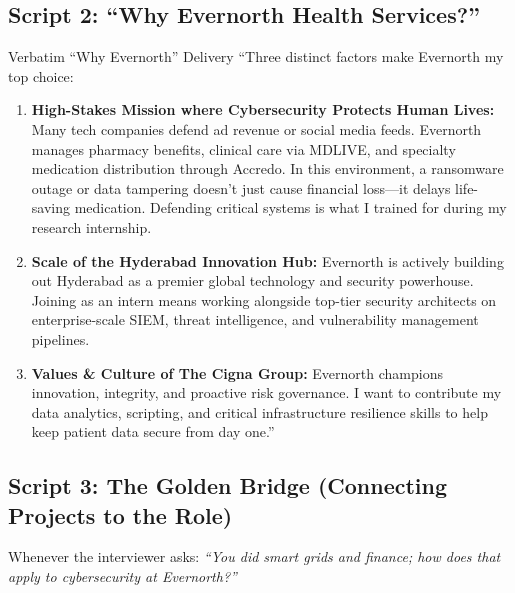 \documentclass[10pt,a4paper]{article}
\begin{document}
\subsection{Script 2: ``Why Evernorth Health Services?''}
\begin{scriptbox}{Verbatim ``Why Evernorth'' Delivery}
``Three distinct factors make Evernorth my top choice:
\begin{enumerate}[noitemsep]
    \item \textbf{High-Stakes Mission where Cybersecurity Protects Human Lives:} Many tech companies defend ad revenue or social media feeds. Evernorth manages pharmacy benefits, clinical care via MDLIVE, and specialty medication distribution through Accredo. In this environment, a ransomware outage or data tampering doesn't just cause financial loss---it delays life-saving medication. Defending critical systems is what I trained for during my research internship.
    \item \textbf{Scale of the Hyderabad Innovation Hub:} Evernorth is actively building out Hyderabad as a premier global technology and security powerhouse. Joining as an intern means working alongside top-tier security architects on enterprise-scale SIEM, threat intelligence, and vulnerability management pipelines.
    \item \textbf{Values \& Culture of The Cigna Group:} Evernorth champions innovation, integrity, and proactive risk governance. I want to contribute my data analytics, scripting, and critical infrastructure resilience skills to help keep patient data secure from day one.''
\end{enumerate}
\end{scriptbox}

\subsection{Script 3: The Golden Bridge (Connecting Projects to the Role)}
Whenever the interviewer asks: \textit{``You did smart grids and finance; how does that apply to cybersecurity at Evernorth?''}
\end{document}
